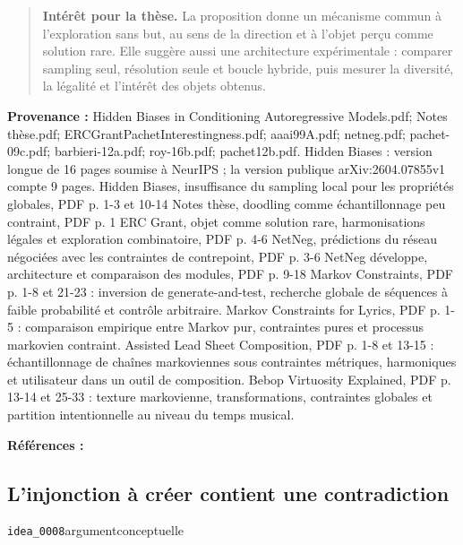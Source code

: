 \documentclass[10pt,a4paper]{article}
\begin{document}
\begin{quote}
\textbf{Intérêt pour la thèse.} La proposition donne un mécanisme commun à l'exploration sans but, au sens de la direction et à l'objet perçu comme solution rare. Elle suggère aussi une architecture expérimentale : comparer sampling seul, résolution seule et boucle hybride, puis mesurer la diversité, la légalité et l'intérêt des objets obtenus.
\end{quote}
{\footnotesize\color{metadata}\textbf{Provenance :} Hidden Biases in Conditioning Autoregressive Models.pdf; Notes thèse.pdf; ERCGrantPachetInterestingness.pdf; aaai99A.pdf; netneg.pdf; pachet-09c.pdf; barbieri-12a.pdf; roy-16b.pdf; pachet12b.pdf. Hidden Biases : version longue de 16 pages soumise à NeurIPS ; la version publique arXiv:2604.07855v1 compte 9 pages. Hidden Biases, insuffisance du sampling local pour les propriétés globales, PDF p. 1-3 et 10-14 Notes thèse, doodling comme échantillonnage peu contraint, PDF p. 1 ERC Grant, objet comme solution rare, harmonisations légales et exploration combinatoire, PDF p. 4-6 NetNeg, prédictions du réseau négociées avec les contraintes de contrepoint, PDF p. 3-6 NetNeg développe, architecture et comparaison des modules, PDF p. 9-18 Markov Constraints, PDF p. 1-8 et 21-23 : inversion de generate-and-test, recherche globale de séquences à faible probabilité et contrôle arbitraire. Markov Constraints for Lyrics, PDF p. 1-5 : comparaison empirique entre Markov pur, contraintes pures et processus markovien contraint. Assisted Lead Sheet Composition, PDF p. 1-8 et 13-15 : échantillonnage de chaînes markoviennes sous contraintes métriques, harmoniques et utilisateur dans un outil de composition. Bebop Virtuosity Explained, PDF p. 13-14 et 25-33 : texture markovienne, transformations, contraintes globales et partition intentionnelle au niveau du temps musical.\par}
{\footnotesize\color{metadata}\textbf{Références :} \parencite{pachet2026biases,goldman1999netneg,pachet2011markov,barbieri2012lyrics,papadopoulos2016flowcomposer,pachet2012virtuosity}\par}

\subsection{L'injonction à créer contient une contradiction}
{\small\color{metadata} \texttt{idea\_0008}\quad\textbullet\quad argument\quad\textbullet\quad conceptuelle\par}
\end{document}
